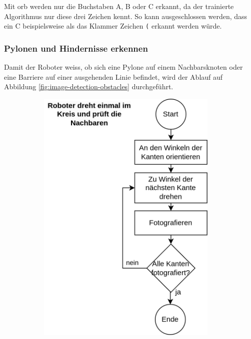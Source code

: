 Mit \acrshort{orb} werden nur die Buchstaben A, B oder C erkannt, da der trainierte Algorithmus nur diese drei Zeichen kennt. So kann ausgeschlossen werden, dass ein C beispielsweise als das Klammer Zeichen \verb|(| erkannt werden würde.


\subsubsection{Pylonen und Hindernisse erkennen}

Damit der Roboter weiss, ob sich eine Pylone auf einem Nachbarsknoten oder eine Barriere auf einer ausgehenden Linie befindet, wird der Ablauf auf Abbildung \ref{fig:image-detection-obstacles} durchgeführt.

\begin{figure}[H]
\centering
\begin{subfigure}{0.45\textwidth}
\centering
\includegraphics[width=0.95\textwidth]{assets/gesamtkonzept/ablaufdiagramm-hindernisse-erkennen.png}

\end{subfigure}
\end{figure}
